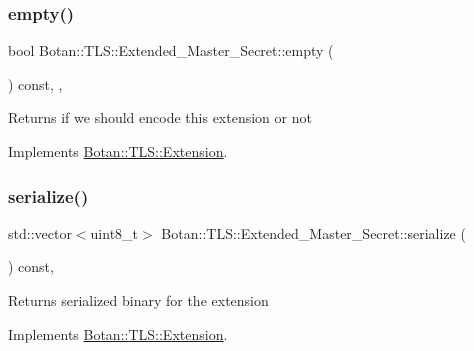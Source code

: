 \subsubsection{\texorpdfstring{empty()}{empty()}}
{\footnotesize\ttfamily bool Botan\+::\+T\+L\+S\+::\+Extended\+\_\+\+Master\+\_\+\+Secret\+::empty (\begin{DoxyParamCaption}{ }\end{DoxyParamCaption}) const\hspace{0.3cm}{\ttfamily [inline]}, {\ttfamily [override]}, {\ttfamily [virtual]}}

\begin{DoxyReturn}{Returns}
if we should encode this extension or not 
\end{DoxyReturn}


Implements \hyperlink{class_botan_1_1_t_l_s_1_1_extension_aa850b9be2322f94e7c65e583cd51acc5}{Botan\+::\+T\+L\+S\+::\+Extension}.

\mbox{\label{class_botan_1_1_t_l_s_1_1_extended___master___secret_a5119fdc525bd8285fbd32ab6b7aa6daa}} 
\subsubsection{\texorpdfstring{serialize()}{serialize()}}
{\footnotesize\ttfamily std\+::vector$<$uint8\+\_\+t$>$ Botan\+::\+T\+L\+S\+::\+Extended\+\_\+\+Master\+\_\+\+Secret\+::serialize (\begin{DoxyParamCaption}{ }\end{DoxyParamCaption}) const\hspace{0.3cm}{\ttfamily [override]}, {\ttfamily [virtual]}}

\begin{DoxyReturn}{Returns}
serialized binary for the extension 
\end{DoxyReturn}


Implements \hyperlink{class_botan_1_1_t_l_s_1_1_extension_a56788726ad2526db54e5a26039cb69db}{Botan\+::\+T\+L\+S\+::\+Extension}.

\mbox{\label{class_botan_1_1_t_l_s_1_1_extended___master___secret_a4e0c181be783e0c301c286ffacd682ef}} 
